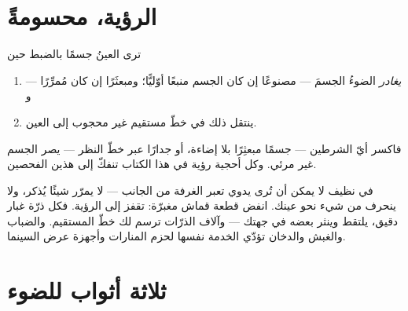 \section{الرؤية، محسومةً}

\begin{proposition}\label{prop:g7:light-sources-propagation:vision}
ترى العينُ جسمًا بالضبط حين
\begin{enumerate}
  \item \emph{يغادر} الضوءُ الجسمَ --- مصنوعًا إن كان الجسم
        منبعًا أوّليًّا؛ ومبعثَرًا إن كان مُمرِّرًا --- و
  \item ينتقل ذلك  في خطّ مستقيم غير محجوب إلى العين.
\end{enumerate}
فاكسر أيّ الشرطين --- جسمًا مبعثِرًا بلا إضاءة، أو جدارًا عبر
خطّ النظر --- يصر الجسم غير مرئي. وكل أحجية رؤية في هذا الكتاب
تنفكّ إلى هذين الفحصين.
\end{proposition}

\begin{example}\label{ex:g7:light-sources-propagation:beam}
في  نظيف لا يمكن أن تُرى   يدوي تعبر الغرفة من
الجانب ---  لا يمرّر شيئًا يُذكر، ولا ينحرف من 
 شيء نحو عينك. انفض قطعة قماش مغبرّة: تقفز  إلى
الرؤية. فكل ذرّة غبار  دقيق، يلتقط   وينثر
بعضه في جهتك --- وآلاف الذرّات ترسم لك خطّ  المستقيم.
والضباب والغبش والدخان تؤدّي الخدمة نفسها لحزم المنارات وأجهزة
عرض السينما.
\end{example}

\section{ثلاثة أثواب للضوء}

